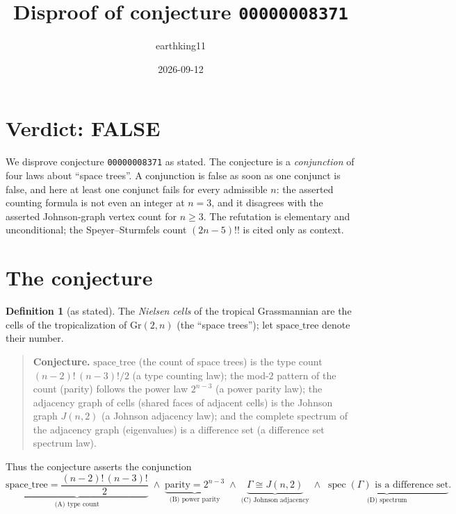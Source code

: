 \documentclass[11pt]{article}
\title{Disproof of conjecture \texttt{00000008371}}
\author{earthking11}
\date{2026-09-12}
\theoremstyle{definition}
\newtheorem{definition}[theorem]{Definition}
\theoremstyle{remark}
\begin{document}
\maketitle

\section*{Verdict: FALSE}

We disprove conjecture \texttt{00000008371} as stated. The conjecture is a
\emph{conjunction} of four laws about ``space trees''. A conjunction is false as
soon as one conjunct is false, and here at least one conjunct fails for every
admissible $n$: the asserted counting formula is not even an integer at $n = 3$,
and it disagrees with the asserted Johnson-graph vertex count for $n \ge 3$. The
refutation is elementary and unconditional; the Speyer--Sturmfels count
$(2n-5)!!$ is cited only as context.

\section{The conjecture}

\begin{definition}[as stated]
The \emph{Nielsen cells} of the tropical Grassmannian are the cells of the
tropicalization of $\mathrm{Gr}(2,n)$ (the ``space trees''); let
$\mathrm{space\_tree}$ denote their number.
\end{definition}

\begin{quote}
\textbf{Conjecture.} $\mathrm{space\_tree}$ (the count of space trees) is the type
count $(n-2)!\,(n-3)!/2$ (a type counting law); the mod-$2$ pattern of the count
(parity) follows the power law $2^{n-3}$ (a power parity law); the adjacency graph
of cells (shared faces of adjacent cells) is the Johnson graph $J(n,2)$ (a Johnson
adjacency law); and the complete spectrum of the adjacency graph (eigenvalues) is a
difference set (a difference set spectrum law).
\end{quote}

Thus the conjecture asserts the conjunction
\[
\underbrace{\mathrm{space\_tree} = \frac{(n-2)!\,(n-3)!}{2}}_{\text{(A) type count}}
\;\wedge\;
\underbrace{\text{parity} = 2^{n-3}}_{\text{(B) power parity}}
\;\wedge\;
\underbrace{\Gamma \cong J(n,2)}_{\text{(C) Johnson adjacency}}
\;\wedge\;
\underbrace{\operatorname{spec}(\Gamma)\text{ is a difference set}}_{\text{(D) spectrum}} .
\]
\end{document}
